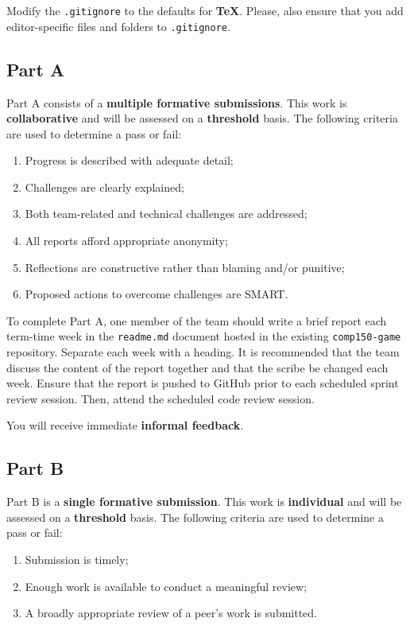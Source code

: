 \documentclass{../fal_assignment}
\begin{document}
Modify the \texttt{.gitignore} to the defaults for \textbf{TeX}. Please, also ensure that you add editor-specific files and folders to \texttt{.gitignore}. 

\subsection*{Part A}

Part A consists of a \textbf{multiple formative submissions}. This work is \textbf{collaborative} and will be assessed on a \textbf{threshold} basis. The following criteria are used to determine a pass or fail:

\begin{enumerate}[label=(\alph*)]
	\item Progress is described with adequate detail;
	\item Challenges are clearly explained;
	\item Both team-related and technical challenges are addressed;
	\item All reports afford appropriate anonymity;
	\item Reflections are constructive rather than blaming and/or punitive;
	\item Proposed actions to overcome challenges are SMART.
\end{enumerate}

To complete Part A, one member of the team should write a brief report each term-time week in the \texttt{readme.md} document hosted in the existing \texttt{comp150-game} repository. Separate each week with a heading. It is recommended that the team discuss the content of the report together and that the scribe be changed each week.  Ensure that the report is pushed to GitHub prior to each scheduled sprint review session. Then, attend the scheduled code review session.

You will receive immediate \textbf{informal feedback}.

\subsection*{Part B}

Part B is a \textbf{single formative submission}. This work is \textbf{individual} and will be assessed on a \textbf{threshold} basis. The following criteria are used to determine a pass or fail:

\begin{enumerate}[label=(\alph*)]
	\item Submission is timely;
	\item Enough work is available to conduct a meaningful review;
	\item A broadly appropriate review of a peer's work is submitted.
\end{enumerate}
\end{document}
